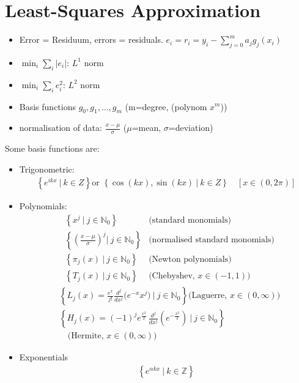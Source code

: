 \section{Least-Squares Approximation}

\begin{itemize}
    \item Error = Residuum, errors = residuals. $e_i=r_i=y_i - \sum_{j=0}^ma_jg_j(x_i)$
    \item $\min_i\sum_i|e_i|$: $L^1$ norm
    \item $\min_i\sum_ie_i^2$: $L^2$ norm
    \item Basis functions $g_0,g_1,\ldots,g_m$ (m=degree, (polynom $x^m$))
    \item normalisation of data: $\frac{x-\mu}{\sigma}$ ($\mu$=mean, $\sigma$=deviation)
\end{itemize}

Some basis functions are:
\begin{itemize}
    \item{
        Trigonometric:
        \begin{align*}
            \left\{e^{i k x}\ |\ k\in Z\right\}{\text{or }}\left\{{\cos(k x){\mathrm{,}}\sin(k x)\ |\ k\in Z}\right\}\quad[x\in(0,2\pi)]
        \end{align*}
    }
    \item{
        Polynomials:
        \begin{align*}
            & \left\{x^{j}\ |\ j\in \mathbb{N}_{0}\right\} & \text{(standard monomials)} \\
            & \left\{\left({\frac{x-\mu}{\sigma}}\right)^{j}|\ j\in \mathbb{N}_{0}\right\} & \text{(normalised standard monomials)} \\
            & \left\{ \pi_{j}(x)\ |\ j\in \mathbb{N}_{0} \right\} & \text{(Newton polynomials)} \\
            & \left\{T_{j}(x)\ |\ j\in \mathbb{N}_{0}\right\} & \text{(Chebyshev, }x\in(-1,1))
        \end{align*}
        \begin{align*}
            & \left\{L_{j}(x)=\frac{e^{x}}{j!}\frac{d^{j}}{d x^{j}}\Big(e^{-x}x^{j}\Big)\ |\ j\in \mathbb{N}_{0}\right\}
            \text{(Laguerre, }x\in(0,\infty)) \\
            & \left\{H_{j}(x)=(-1)^{j}e^{\frac{x^{2}}{2}}\,{\frac{d^{j}}{d x^{j}}}\left(e^{-\frac{x^{2}}{2}}\right)\ |\ j\in \mathbb{N}_{0}\right\} \\
            &\quad\text{(Hermite, }x\in(0,\infty))
        \end{align*}
    }
    \item{
        Exponentials
        \begin{align*}
            \left\{ e^{\alpha kx}\ |\ k\in\mathbb{Z} \right\}
        \end{align*}
    }
\end{itemize}

